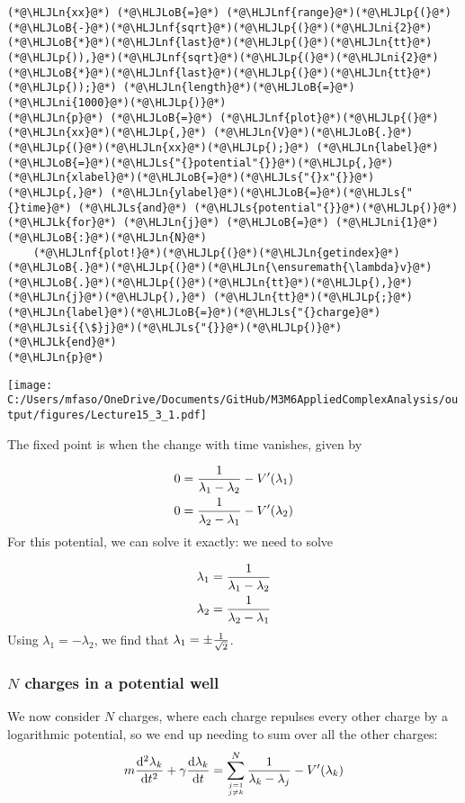 \documentclass[12pt,landscape]{article}
\newcommand{\HLJLk}[1]{\textcolor[RGB]{148,91,176}{\textbf{#1}}}
\newcommand{\HLJLn}[1]{#1}
\newcommand{\HLJLnf}[1]{\textcolor[RGB]{66,102,213}{#1}}
\newcommand{\HLJLs}[1]{\textcolor[RGB]{201,61,57}{#1}}
\newcommand{\HLJLsi}[1]{#1}
\newcommand{\HLJLni}[1]{\textcolor[RGB]{59,151,46}{#1}}
\newcommand{\HLJLoB}[1]{\textcolor[RGB]{102,102,102}{\textbf{#1}}}
\newcommand{\HLJLp}[1]{#1}
\def\D{ {\rm d} }
\def\dt{\D t}
\def\cent#1{\begin{center}#1\end{center} }
\begin{document}
{\begin{lstlisting}
(*@\HLJLn{xx}@*) (*@\HLJLoB{=}@*) (*@\HLJLnf{range}@*)(*@\HLJLp{(}@*)(*@\HLJLoB{-}@*)(*@\HLJLnf{sqrt}@*)(*@\HLJLp{(}@*)(*@\HLJLni{2}@*)(*@\HLJLoB{*}@*)(*@\HLJLnf{last}@*)(*@\HLJLp{(}@*)(*@\HLJLn{tt}@*)(*@\HLJLp{)),}@*)(*@\HLJLnf{sqrt}@*)(*@\HLJLp{(}@*)(*@\HLJLni{2}@*)(*@\HLJLoB{*}@*)(*@\HLJLnf{last}@*)(*@\HLJLp{(}@*)(*@\HLJLn{tt}@*)(*@\HLJLp{));}@*) (*@\HLJLn{length}@*)(*@\HLJLoB{=}@*)(*@\HLJLni{1000}@*)(*@\HLJLp{)}@*)
(*@\HLJLn{p}@*) (*@\HLJLoB{=}@*) (*@\HLJLnf{plot}@*)(*@\HLJLp{(}@*)(*@\HLJLn{xx}@*)(*@\HLJLp{,}@*) (*@\HLJLn{V}@*)(*@\HLJLoB{.}@*)(*@\HLJLp{(}@*)(*@\HLJLn{xx}@*)(*@\HLJLp{);}@*) (*@\HLJLn{label}@*)(*@\HLJLoB{=}@*)(*@\HLJLs{"{}potential"{}}@*)(*@\HLJLp{,}@*) (*@\HLJLn{xlabel}@*)(*@\HLJLoB{=}@*)(*@\HLJLs{"{}x"{}}@*)(*@\HLJLp{,}@*) (*@\HLJLn{ylabel}@*)(*@\HLJLoB{=}@*)(*@\HLJLs{"{}time}@*) (*@\HLJLs{and}@*) (*@\HLJLs{potential"{}}@*)(*@\HLJLp{)}@*)
(*@\HLJLk{for}@*) (*@\HLJLn{j}@*) (*@\HLJLoB{=}@*) (*@\HLJLni{1}@*)(*@\HLJLoB{:}@*)(*@\HLJLn{N}@*)
    (*@\HLJLnf{plot!}@*)(*@\HLJLp{(}@*)(*@\HLJLn{getindex}@*)(*@\HLJLoB{.}@*)(*@\HLJLp{(}@*)(*@\HLJLn{\ensuremath{\lambda}v}@*)(*@\HLJLoB{.}@*)(*@\HLJLp{(}@*)(*@\HLJLn{tt}@*)(*@\HLJLp{),}@*)(*@\HLJLn{j}@*)(*@\HLJLp{),}@*) (*@\HLJLn{tt}@*)(*@\HLJLp{;}@*) (*@\HLJLn{label}@*)(*@\HLJLoB{=}@*)(*@\HLJLs{"{}charge}@*) (*@\HLJLsi{{\$}j}@*)(*@\HLJLs{"{}}@*)(*@\HLJLp{)}@*)
(*@\HLJLk{end}@*)
(*@\HLJLn{p}@*)
\end{lstlisting}

\cent{\texttt{[image: C:/Users/mfaso/OneDrive/Documents/GitHub/M3M6AppliedComplexAnalysis/output/figures/Lecture15\_3\_1.pdf]}}

The fixed point is when the change with time vanishes, given by


\begin{align*}
0 = {1 \over \lambda_1 -\lambda_2} - V'(\lambda_1) \\
0 = {1 \over \lambda_2 -\lambda_1} - V'(\lambda_2)
\end{align*}
For this potential, we can solve it exactly: we need to solve


\begin{align*}
\lambda_1 = {1 \over \lambda_1 -\lambda_2}  \\
\lambda_2 = {1 \over \lambda_2 -\lambda_1}
\end{align*}
Using $\lambda_1 = -\lambda_2$, we find that $\lambda_1 = \pm{1 \over \sqrt 2}$.
\newpage
\subsubsection{$N$ charges in a potential well}
We now consider $N$ charges, where each charge repulses every other charge by a logarithmic potential, so we end up needing to sum over all the other charges:
\begin{align*}
m {\D^2 \lambda_k \over \D t^2} + \gamma {\D \lambda_k \over \dt}  =
    \sum_{j=1 \atop j \neq k}^N {1 \over \lambda_k -\lambda_j} - V'(\lambda_k)
\end{align*}

}
\end{document}
